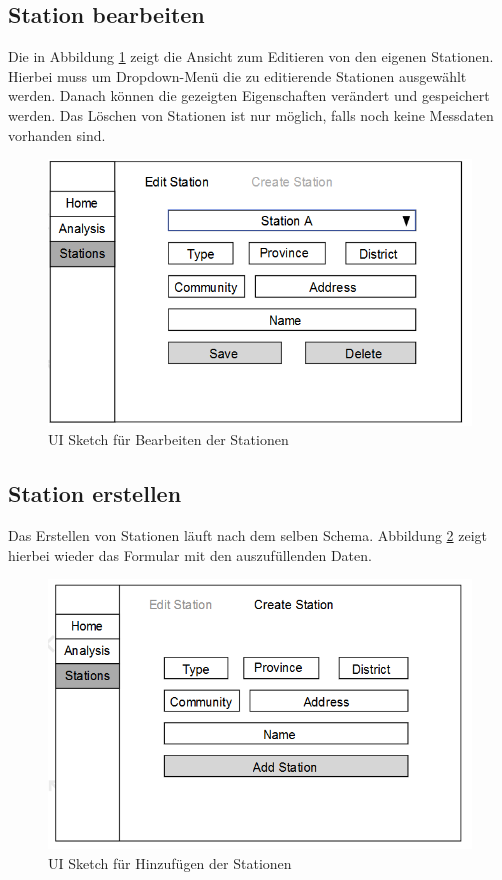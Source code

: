 \subsection{Station bearbeiten}

Die in Abbildung \ref{fig:cock_edit} zeigt die Ansicht zum Editieren von den eigenen Stationen. Hierbei muss um Dropdown-Menü die zu editierende Stationen ausgewählt werden. Danach können die gezeigten Eigenschaften verändert und gespeichert werden. Das Löschen von Stationen ist nur möglich, falls noch keine Messdaten vorhanden sind.

\begin{figure}[H]
\centering
\includegraphics[width=1\textwidth]{pictures/sketches/cockpit/cockpit_edit.png}
\caption{UI Sketch für Bearbeiten der Stationen}
\label{fig:cock_edit}
\end{figure}
\raggedright
\newpage

\subsection{Station erstellen}
Das Erstellen von Stationen läuft nach dem selben Schema. Abbildung \ref{fig:cock_add} zeigt hierbei wieder das Formular mit den auszufüllenden Daten.
\begin{figure}[H]
\centering
\includegraphics[width=1\textwidth]{pictures/sketches/cockpit/cockpit_create.png}
\caption{UI Sketch für Hinzufügen der Stationen}
\label{fig:cock_add}
\end{figure}
\raggedright
\newpage
